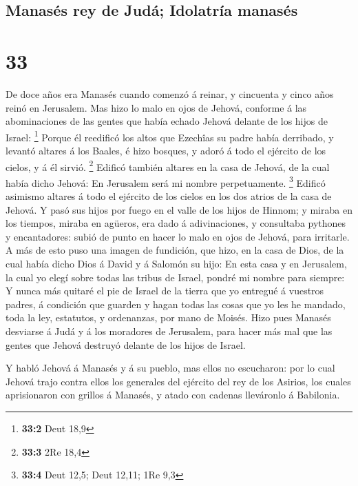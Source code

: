 \hypertarget{manasuxe9s-rey-de-juduxe1-idolatruxeda-manasuxe9s}{%
\subsection{Manasés rey de Judá; Idolatría
manasés}\label{manasuxe9s-rey-de-juduxe1-idolatruxeda-manasuxe9s}}

\hypertarget{section-32}{%
\section{33}\label{section-32}}

 De doce años era Manasés cuando comenzó á reinar, y
cincuenta y cinco años reinó en Jerusalem.  Mas hizo lo malo
en ojos de Jehová, conforme á las abominaciones de las gentes que había
echado Jehová delante de los hijos de Israel: \footnote{\textbf{33:2}
  Deut 18,9}  Porque él reedificó los altos que Ezechîas su
padre había derribado, y levantó altares á los Baales, é hizo bosques, y
adoró á todo el ejército de los cielos, y á él sirvió. \footnote{\textbf{33:3}
  2Re 18,4}  Edificó también altares en la casa de Jehová,
de la cual había dicho Jehová: En Jerusalem será mi nombre
perpetuamente. \footnote{\textbf{33:4} Deut 12,5; Deut 12,11; 1Re 9,3}
 Edificó asimismo altares á todo el ejército de los cielos
en los dos atrios de la casa de Jehová.  Y pasó sus hijos
por fuego en el valle de los hijos de Hinnom; y miraba en los tiempos,
miraba en agüeros, era dado á adivinaciones, y consultaba pythones y
encantadores: subió de punto en hacer lo malo en ojos de Jehová, para
irritarle.  A más de esto puso una imagen de fundición, que
hizo, en la casa de Dios, de la cual había dicho Dios á David y á
Salomón su hijo: En esta casa y en Jerusalem, la cual yo elegí sobre
todas las tribus de Israel, pondré mi nombre para siempre: 
Y nunca más quitaré el pie de Israel de la tierra que yo entregué á
vuestros padres, á condición que guarden y hagan todas las cosas que yo
les he mandado, toda la ley, estatutos, y ordenanzas, por mano de
Moisés.  Hizo pues Manasés desviarse á Judá y á los
moradores de Jerusalem, para hacer más mal que las gentes que Jehová
destruyó delante de los hijos de Israel.

 Y habló Jehová á Manasés y á su pueblo, mas ellos no
escucharon: por lo cual Jehová trajo contra ellos los generales del
ejército del rey de los Asirios, los cuales aprisionaron con grillos á
Manasés, y atado con cadenas lleváronlo á Babilonia.

